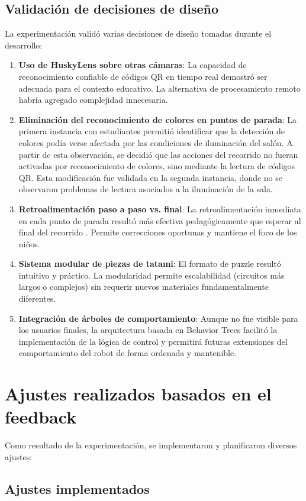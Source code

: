 \documentclass{prgrado}
\begin{document}
\subsection{Validación de decisiones de diseño}
La experimentación validó varias decisiones de diseño tomadas durante el desarrollo:
\begin{enumerate}
\item \textbf{Uso de HuskyLens sobre otras cámaras}: La capacidad de reconocimiento confiable de códigos QR en tiempo real demostró ser adecuada para el contexto educativo. La alternativa de procesamiento remoto habría agregado complejidad innecesaria.
\item \textbf{Eliminación del reconocimiento de colores en puntos de parada}: La primera instancia con estudiantes permitió identificar que la detección de colores podía verse afectada por las condiciones de iluminación del salón. A partir de esta observación, se decidió que las acciones del recorrido no fueran activadas por reconocimiento de colores, sino mediante la lectura de códigos QR. Esta modificación fue validada en la segunda instancia, donde no se observaron problemas de lectura asociados a la iluminación de la sala.
\item \textbf{Retroalimentación paso a paso vs. final}: La retroalimentación inmediata en cada punto de parada resultó más efectiva pedagógicamente que esperar al final del recorrido \cite{marwan2022adaptiveFeedback}.  Permite correcciones oportunas y mantiene el foco de los niños.
\item \textbf{Sistema modular de piezas de tatami}: El formato de puzzle resultó intuitivo y práctico. La modularidad permite escalabilidad (circuitos más largos o complejos) sin requerir nuevos materiales fundamentalmente diferentes.
\item \textbf{Integración de árboles de comportamiento}: Aunque no fue visible para los usuarios finales, la arquitectura basada en Behavior Trees facilitó la implementación de la lógica de control y permitirá futuras extensiones del comportamiento del robot de forma ordenada y mantenible.
\end{enumerate}
\section{Ajustes realizados basados en el feedback}
Como resultado de la experimentación, se implementaron y planificaron diversos ajustes:
\subsection{Ajustes implementados}
\end{document}
